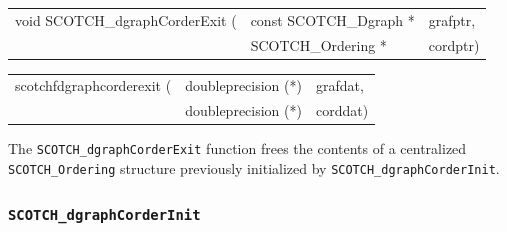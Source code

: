 \begin{itemize}
\progsyn

{\tt\begin{tabular}{l@{}ll}
void SCOTCH\_dgraphCorderExit ( & const SCOTCH\_Dgraph * & grafptr, \\
                                & SCOTCH\_Ordering *     & cordptr)
\end{tabular}}

{\tt\begin{tabular}{l@{}ll}
scotchfdgraphcorderexit ( & doubleprecision (*) & grafdat, \\
                          & doubleprecision (*) & corddat)
\end{tabular}}

\progdes

The {\tt SCOTCH\_dgraphCorderExit} function frees the contents of a
centralized {\tt SCOTCH\_\lbt Ordering} structure previously
initialized by {\tt SCOTCH\_\lbt dgraph\lbt Corder\lbt Init}.
\end{itemize}


\subsubsection{{\tt SCOTCH\_dgraphCorderInit}}
\label{sec-lib-func-dgraphcorderinit}

